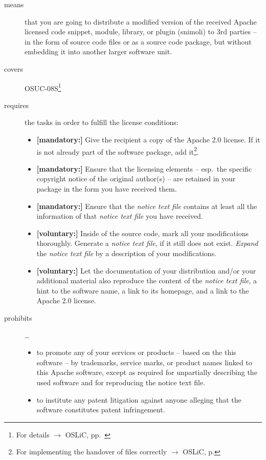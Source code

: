 \begin{description}
\item[means] that you are going to distribute a modified version of the received
Apache licensed code snippet, module, library, or plugin (snimoli) to 3rd
parties -- in the form of source code files or as a source code package, but
without embedding it into another larger software unit.
\item[covers] OSUC-08S\footnote{For details $\rightarrow$ OSLiC, pp.\
\pageref{OSUC-08S-DEF}}
\item[requires] the tasks in order to fulfill the license conditions:
\begin{itemize}
  
  \item \textbf{[mandatory:]} Give the recipient a copy of the Apache 2.0
  license. If it is not already part of the software package, add
  it\footnote{For implementing the handover of files correctly $\rightarrow$
  OSLiC, p. \pageref{DistributingFilesHint}}.

  \item \textbf{[mandatory:]} Ensure that the licensing elements -- esp.\ the
  specific copyright notice of the original author(s) -- are retained in your
  package in the form you have received them.
  
  \item \textbf{[mandatory:]} Ensure that the \emph{notice text file} contains
  at least all the information of that \emph{notice text file} you have
  received.
 
  \item \textbf{[voluntary:]} Inside of the source code, mark all your
  modifications thoroughly. Generate a \emph{notice text file}, if it still does
  not exist. \emph{Expand} the \emph{notice text file} by a description of your
  modifications.
   
  \item \textbf{[voluntary:]} Let the documentation of your distribution and/or
  your additional material also reproduce the content of the \emph{notice text
  file}, a hint to the software name, a link to its homepage, and a link to the
  Apache 2.0 license.

\end{itemize}

\item[prohibits] \ldots
\begin{itemize}
  \item to promote any of your services or products – based on the this software
  – by trademarks, service marks, or product names linked to this Apache
  software, except as required for unpartially describing the used software and
  for reproducing the notice text file.
  \item to institute any patent litigation against anyone alleging that the
  software constitutes patent infringement.
\end{itemize}

\end{description}


